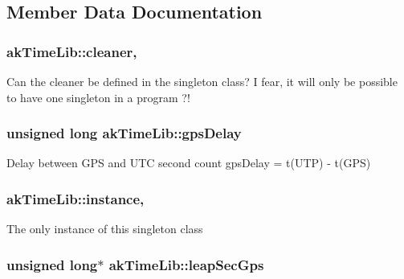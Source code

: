 \subsection{Member Data Documentation}
\hypertarget{classakTimeLib_a69bc0356384bc7976926ac8c9e32847f}{
\subsubsection[{cleaner}]{ ak\-Time\-Lib\-::cleaner\hspace{0.3cm}{\ttfamily [static]}, {\ttfamily [private]}}}\label{classakTimeLib_a69bc0356384bc7976926ac8c9e32847f}
Can the cleaner be defined in the singleton class? I fear, it will only be possible to have one singleton in a program ?! \hypertarget{classakTimeLib_aece53a073d766b0842004433bbb743bc}{
\subsubsection[{gps\-Delay}]{\setlength{\rightskip}{0pt plus 5cm}unsigned long ak\-Time\-Lib\-::gps\-Delay\hspace{0.3cm}{\ttfamily [private]}}}\label{classakTimeLib_aece53a073d766b0842004433bbb743bc}
Delay between G\-P\-S and U\-T\-C second count gps\-Delay = t(\-U\-T\-P) -\/ t(\-G\-P\-S) \hypertarget{classakTimeLib_a85a5f79db7d7ddebce2174d8e7241a62}{
\subsubsection[{instance}]{ ak\-Time\-Lib\-::instance\hspace{0.3cm}{\ttfamily [static]}, {\ttfamily [private]}}}\label{classakTimeLib_a85a5f79db7d7ddebce2174d8e7241a62}
The only instance of this singleton class \hypertarget{classakTimeLib_a0e3a8f8795bb2911947530ccbfe8797f}{
\subsubsection[{leap\-Sec\-Gps}]{\setlength{\rightskip}{0pt plus 5cm}unsigned long$\ast$ ak\-Time\-Lib\-::leap\-Sec\-Gps\hspace{0.3cm}{\ttfamily [private]}}}\label{classakTimeLib_a0e3a8f8795bb2911947530ccbfe8797f}
